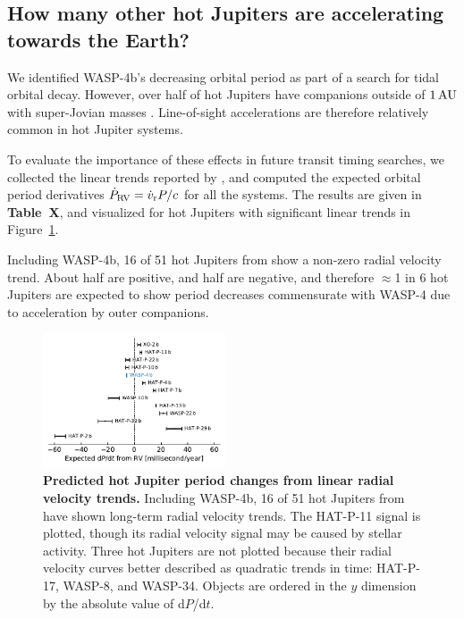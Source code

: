 \documentclass[12pt,twocolumn,tighten]{aastex62}
\begin{document}
\subsection{How many other hot Jupiters are accelerating towards the
Earth?}

We identified WASP-4b's decreasing orbital period as part of a search
for tidal orbital decay.  However, over half of hot Jupiters have
companions outside of $1\,{\rm AU}$ with super-Jovian masses
\citep{knutson_friends_2014}.  Line-of-sight accelerations are
therefore relatively common in hot Jupiter systems. 

To evaluate the importance of these effects in future transit timing
searches, we collected the linear trends reported by
\citet{knutson_friends_2014}, and computed the expected orbital period
derivatives $\dot{P}_{\rm RV} = \dot{v}_{\rm r} P/c$ for all the
systems.
The results are given in {\bf Table~X}, and visualized for hot
Jupiters with significant linear trends in Figure~\ref{fig:pdot_pop}.

Including WASP-4b, 16 of 51 hot Jupiters from
\citet{knutson_friends_2014} show a non-zero radial velocity trend.
About half are positive, and half are negative, and therefore
$\approx$1 in 6 hot Jupiters are expected to show period decreases
commensurate with WASP-4 due to acceleration by outer companions.



\begin{figure}[t]
	\begin{center}
		\leavevmode
		\includegraphics[width=0.48\textwidth]{f5.pdf}
	\end{center}
	\vspace{-0.7cm}
	\caption{
  {\bf Predicted hot Jupiter period changes from linear radial
  velocity trends.} Including WASP-4b, 16 of 51 hot Jupiters from
  \citet{knutson_friends_2014} have shown long-term radial velocity
  trends.  The HAT-P-11 signal is plotted, though its radial velocity
  signal may be caused by stellar activity.  Three hot Jupiters are
  not plotted because their radial velocity curves better described as
  quadratic trends in time: HAT-P-17, WASP-8, and WASP-34.  Objects
  are ordered in the $y$ dimension by the absolute value of d$P$/d$t$.
	\label{fig:pdot_pop}
  \vspace{-0.3cm}
	}
\end{figure}
\end{document}
